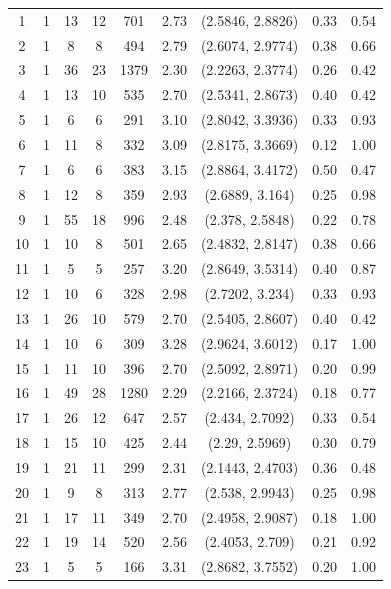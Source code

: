 \documentclass{article}
\begin{document}
\begin{appendices}
\begin{longtable}{ccccccccc}
\hline
\endlastfoot

1 &   1 &  13 &  12 & 701 & 2.73 & (2.5846, 2.8826) & 0.33 & 0.54 \\ 
2 &   1 &   8 &   8 & 494 & 2.79 & (2.6074, 2.9774) & 0.38 & 0.66 \\ 
3 &   1 &  36 &  23 & 1379 & 2.30 & (2.2263, 2.3774) & 0.26 & 0.42 \\ 
4 &   1 &  13 &  10 & 535 & 2.70 & (2.5341, 2.8673) & 0.40 & 0.42 \\ 
5 &   1 &   6 &   6 & 291 & 3.10 & (2.8042, 3.3936) & 0.33 & 0.93 \\ 
6 &   1 &  11 &   8 & 332 & 3.09 & (2.8175, 3.3669) & 0.12 & 1.00 \\ 
7 &   1 &   6 &   6 & 383 & 3.15 & (2.8864, 3.4172) & 0.50 & 0.47 \\ 
8 &   1 &  12 &   8 & 359 & 2.93 & (2.6889, 3.164) & 0.25 & 0.98 \\ 
9 &   1 &  55 &  18 & 996 & 2.48 & (2.378, 2.5848) & 0.22 & 0.78 \\ 
10 &   1 &  10 &   8 & 501 & 2.65 & (2.4832, 2.8147) & 0.38 & 0.66 \\ 
11 &   1 &   5 &   5 & 257 & 3.20 & (2.8649, 3.5314) & 0.40 & 0.87 \\ 
12 &   1 &  10 &   6 & 328 & 2.98 & (2.7202, 3.234) & 0.33 & 0.93 \\ 
13 &   1 &  26 &  10 & 579 & 2.70 & (2.5405, 2.8607) & 0.40 & 0.42 \\ 
14 &   1 &  10 &   6 & 309 & 3.28 & (2.9624, 3.6012) & 0.17 & 1.00 \\ 
15 &   1 &  11 &  10 & 396 & 2.70 & (2.5092, 2.8971) & 0.20 & 0.99 \\ 
16 &   1 &  49 &  28 & 1280 & 2.29 & (2.2166, 2.3724) & 0.18 & 0.77 \\ 
17 &   1 &  26 &  12 & 647 & 2.57 & (2.434, 2.7092) & 0.33 & 0.54 \\ 
18 &   1 &  15 &  10 & 425 & 2.44 & (2.29, 2.5969) & 0.30 & 0.79 \\ 
19 &   1 &  21 &  11 & 299 & 2.31 & (2.1443, 2.4703) & 0.36 & 0.48 \\ 
20 &   1 &   9 &   8 & 313 & 2.77 & (2.538, 2.9943) & 0.25 & 0.98 \\ 
21 &   1 &  17 &  11 & 349 & 2.70 & (2.4958, 2.9087) & 0.18 & 1.00 \\ 
22 &   1 &  19 &  14 & 520 & 2.56 & (2.4053, 2.709) & 0.21 & 0.92 \\ 
23 &   1 &   5 &   5 & 166 & 3.31 & (2.8682, 3.7552) & 0.20 & 1.00 \\ 

\end{longtable}
\end{appendices}
\end{document}
